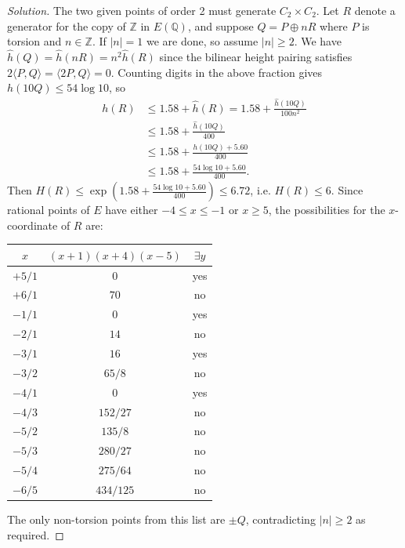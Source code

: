 \documentclass[a4paper]{article}
\theoremstyle{plain}
\theoremstyle{remark}
\theoremstyle{definition}
\newcommand{\Z}{\mathbb{Z}}
\newcommand{\Q}{\mathbb{Q}}
\begin{document}
\begin{enumerate}
        \begin{proof}[Solution]
            The two given points of order 2 must generate $C_2\times C_2$. Let
            $R$ denote a generator for the copy of $\Z$ in $E(\Q)$, and suppose
            $Q=P\oplus nR$ where $P$ is torsion and $n\in\Z$. If $|n|=1$ we are
            done, so assume $|n|\ge2$. We have
            $\hat h(Q)=\hat h(nR)=n^2\hat h(R)$ since the bilinear height
            pairing satisfies $2\langle P,Q\rangle=\langle2P,Q\rangle=0$.
            Counting digits in the above fraction gives $h(10Q)\le54\log10$, so
            \begin{align*}
                h(R)
                    &\le 1.58 + \hat h(R)
                    = 1.58 + \frac{\hat h(10Q)}{100n^2} \\
                    &\le 1.58 + \frac{\hat h(10Q)}{400} \\
                    &\le 1.58 + \frac{h(10Q) + 5.60}{400} \\
                    &\le 1.58 + \frac{54\log10+5.60}{400}.
            \end{align*}
            Then $H(R)\le\exp(1.58+\frac{54\log10+5.60}{400})\le6.72$, i.e.
            $H(R)\le6$. Since rational points of $E$ have either $-4\le x\le-1$
            or $x\ge5$, the possibilities for the $x$-coordinate of $R$ are:
            \begin{center}
                \begin{tabular}{|c|c|c|}
                    \hline
                    $x$ & $(x+1)(x+4)(x-5)$ & $\exists y$ \\
                    \hline
                    $+5/1$ & $0$ & yes \\
                    \hline
                    $+6/1$ & $70$ & no \\
                    \hline
                    $-1/1$ & $0$ & yes \\
                    \hline
                    $-2/1$ & $14$ & no \\
                    \hline
                    $-3/1$ & $16$ & yes \\
                    \hline
                    $-3/2$ & $65/8$ & no \\
                    \hline
                    $-4/1$ & $0$ & yes \\
                    \hline
                    $-4/3$ & $152/27$ & no \\
                    \hline
                    $-5/2$ & $135/8$ & no \\
                    \hline
                    $-5/3$ & $280/27$ & no \\
                    \hline
                    $-5/4$ & $275/64$ & no \\
                    \hline
                    $-6/5$ & $434/125$ & no \\
                    \hline
                \end{tabular}
            \end{center}
            The only non-torsion points from this list are $\pm Q$,
            contradicting $|n|\ge2$ as required.
        \end{proof}


\end{enumerate}
\end{document}
